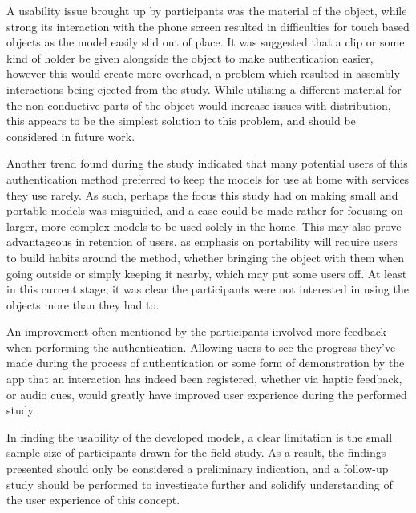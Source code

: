 \documentclass{l4proj}
\begin{document}
A usability issue brought up by participants was the material of the object, while strong its interaction with the phone screen resulted in difficulties for touch based objects as the model easily slid out of place. It was suggested that a clip or some kind of holder be given alongside the object to make authentication easier, however this would create more overhead, a problem which resulted in assembly interactions being ejected from the study. While utilising a different material for the non-conductive parts of the object would increase issues with distribution, this appears to be the simplest solution to this problem, and should be considered in future work.

Another trend found during the study indicated that many potential users of this authentication method preferred to keep the models for use at home with services they use rarely. As such, perhaps the focus this study had on making small and portable models was misguided, and a case could be made rather for focusing on larger, more complex models to be used solely in the home. This may also prove advantageous in retention of users, as emphasis on portability will require users to build habits around the method, whether bringing the object with them when going outside or simply keeping it nearby, which may put some users off. At least in this current stage, it was clear the participants were not interested in using the objects more than they had to.

An improvement often mentioned by the participants involved more feedback when performing the authentication. Allowing users to see the progress they've made during the process of authentication or some form of demonstration by the app that an interaction has indeed been registered, whether via haptic feedback, or audio cues, would greatly have improved user experience during the performed study.

In finding the usability of the developed models, a clear limitation is the small sample size of participants drawn for the field study. As a result, the findings presented should only be considered a preliminary indication, and a follow-up study should be performed to investigate further and solidify understanding of the user experience of this concept.
\end{document}
